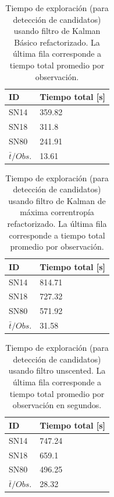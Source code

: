 \begin{table}[h!]
\centering
\caption{Tiempo de exploraci\'on (para detecci\'on de candidatos) usando filtro de Kalman B\'asico refactorizado. La \'ultima fila corresponde a tiempo total promedio por observaci\'on.}
\begin{tabular}{|l|l|}
\hline
\textbf{ID} & \textbf{Tiempo total [s]} \\ \hline
\hline
SN14  & 359.82 \\\hline
SN18  & 311.8\\\hline
SN80  & 241.91 \\\hline\hline
 $\bar{t}/Obs. $& 13.61 \\\hline 
\end{tabular}
\label{tab:t8}
\end{table}


\begin{table}[h!]
\centering
\caption{Tiempo de exploraci\'on (para detecci\'on de candidatos) usando filtro de Kalman de m\'axima correntrop\'ia refactorizado. La \'ultima fila corresponde a tiempo total promedio por observaci\'on.}
\begin{tabular}{|l|l|}
\hline
\textbf{ID} & \textbf{Tiempo total [s]} \\ \hline
\hline
SN14  & 814.71 \\\hline
SN18  & 727.32\\\hline
SN80  & 571.92 \\\hline\hline
 $\bar{t}/Obs. $& 31.58 \\\hline 
\end{tabular}
\label{tab:t10}
\end{table}

\begin{table}[h!]
\centering
\caption{Tiempo de exploraci\'on (para detecci\'on de candidatos) usando filtro unscented. La \'ultima fila corresponde a tiempo total promedio por observaci\'on en segundos.}
\begin{tabular}{|l|l|}
\hline
\textbf{ID} & \textbf{Tiempo total [s]} \\ \hline
\hline
SN14  & 747.24 \\\hline
SN18  & 659.1\\\hline
SN80  & 496.25 \\\hline\hline
 $\bar{t}/Obs. $& 28.32 \\\hline 
\end{tabular}
\label{tab:t12}
\end{table}

